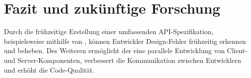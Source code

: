 \chapter{Fazit und zukünftige Forschung}
Durch die frühzeitige Erstellung einer umfassenden \ac{API}-Spezifikation, beispielsweise mithilfe von \OA, können Entwickler Design-Fehler frühzeitig erkennen und beheben.
Des Weiteren ermöglicht der \AFA eine parallele Entwicklung von Client- und Server-Komponenten, verbessert die Kommunikation zwischen Entwicklern und erhöht die Code-Qualität.
